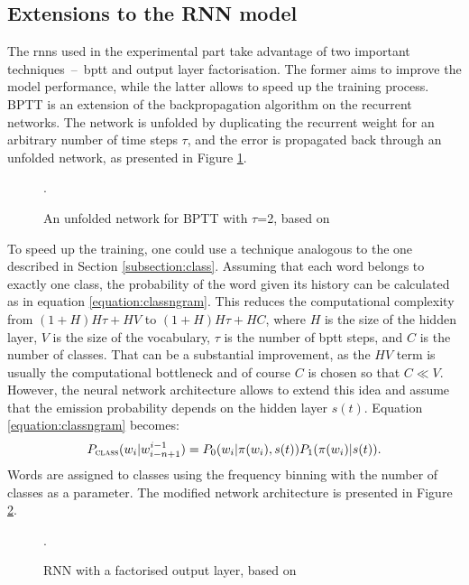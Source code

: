 \subsection{Extensions to the RNN model}
The \glspl{rnn} used in the experimental part take advantage of two important techniques~--~\gls{bptt} and output layer factorisation. The former aims to improve the model performance, while the latter allows to speed up the training process. BPTT is an extension of the backpropagation algorithm on the recurrent networks. The network is unfolded by duplicating the recurrent weight for an arbitrary number of time steps $\tau$, and the error is propagated back through an unfolded network, as presented in Figure \ref{figure:unfolding}.

	\begin{figure}[htbp]
		\centering
		
		\caption[An example of \acrlong{bptt}]{An unfolded network for BPTT with $\tau$=2, based on \cite{boden2002guide}}.
		\label{figure:unfolding}
	\end{figure}

	To speed up the training, one could use a technique analogous to the one described in Section \ref{subsection:class}. Assuming that each word belongs to exactly one class, the probability of the word given its history can be calculated as in equation \ref{equation:classngram}. This reduces the computational complexity from $(1+H)H\tau+HV$ to $(1+H)H\tau+HC$, where $H$ is the size of the hidden layer, $V$ is the size of the vocabulary, $\tau$ is the number of \gls{bptt} steps, and $C$ is the number of classes. That can be a substantial improvement, as the $HV$ term is usually the computational bottleneck and of course $C$ is chosen so that $C\ll V$. However, the neural network architecture allows to extend this idea and assume that the emission probability depends on the hidden layer $s(t)$. Equation \ref{equation:classngram} becomes:
	\begin{equation}
		P_{\textsc{class}}(w_{i}|w_{i-n+1}^{i-1})=P_{0}(w_{i}|\pi(w_{i}), s(t))P_{1}(\pi(w_{i})|s(t)).
		\label{equation:classneural}
	\end{equation}
	Words are assigned to classes using the frequency binning with the number of classes as a parameter. The modified network architecture is presented in Figure \ref{figure:rnnclass}. 

	\begin{figure}[htbp]
		\centering
		
		\caption[A \acrlong{rnn} with a factorised output layer]{RNN with a factorised output layer, based on \cite{mikolov2011extensions}}.
		\label{figure:rnnclass}
	\end{figure}
	

